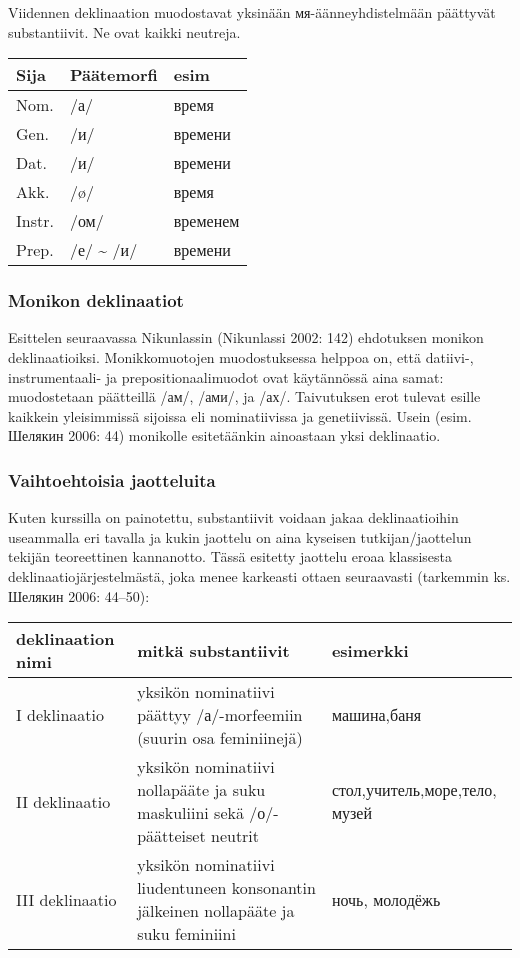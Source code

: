 \documentclass[]{scrartcl}
\begin{document}
Viidennen deklinaation muodostavat yksinään мя-äänneyhdistelmään
päättyvät substantiivit. Ne ovat kaikki neutreja.

\begin{longtable}[c]{@{}lll@{}}
\toprule
Sija & Päätemorfi & esim\tabularnewline
\midrule
\endhead
Nom. & /а/ & время\tabularnewline
Gen. & /и/ & времени\tabularnewline
Dat. & /и/ & времени\tabularnewline
Akk. & /ø/ & время\tabularnewline
Instr. & /ом/ & временем\tabularnewline
Prep. & /е/ \textasciitilde{} /и/ & времени\tabularnewline
\bottomrule
\end{longtable}

\subsubsection{Monikon deklinaatiot}\label{monikon-deklinaatiot}

Esittelen seuraavassa Nikunlassin (Nikunlassi 2002: 142) ehdotuksen
monikon deklinaatioiksi. Monikkomuotojen muodostuksessa helppoa on, että
datiivi-, instrumentaali- ja prepositionaalimuodot ovat käytännössä aina
samat: muodostetaan päätteillä /ам/, /ами/, ja /ах/. Taivutuksen erot
tulevat esille kaikkein yleisimmissä sijoissa eli nominatiivissa ja
genetiivissä. Usein (esim. Шелякин 2006: 44) monikolle esitetäänkin
ainoastaan yksi deklinaatio.

\subsubsection{Vaihtoehtoisia
jaotteluita}\label{vaihtoehtoisia-jaotteluita}

Kuten kurssilla on painotettu, substantiivit voidaan jakaa
deklinaatioihin useammalla eri tavalla ja kukin jaottelu on aina
kyseisen tutkijan/jaottelun tekijän teoreettinen kannanotto. Tässä
esitetty jaottelu eroaa klassisesta deklinaatiojärjestelmästä, joka
menee karkeasti ottaen seuraavasti (tarkemmin ks. Шелякин 2006: 44--50):


\begin{longtabu} to \textwidth {|X|X|X|}
\toprule
deklinaation nimi & mitkä substantiivit & esimerkki\tabularnewline
\midrule
\endhead
I deklinaatio & yksikön nominatiivi päättyy /а/-morfeemiin (suurin osa
feminiinejä) & машина,баня\tabularnewline
II deklinaatio & yksikön nominatiivi nollapääte ja suku maskuliini sekä
/о/-päätteiset neutrit & стол,учитель,море,тело, музей\tabularnewline
III deklinaatio & yksikön nominatiivi liudentuneen konsonantin jälkeinen
nollapääte ja suku feminiini & ночь, молодёжь\tabularnewline
\bottomrule
\end{longtabu}
\end{document}
